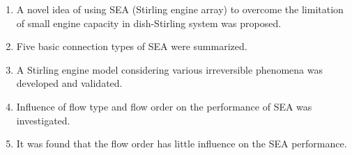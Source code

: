\documentclass[12pt]{letter}
\begin{document}
\begin{enumerate}
\item A novel idea of using SEA (Stirling engine array) to overcome the limitation of small engine capacity in dish-Stirling system was proposed.

\item Five basic connection types of SEA were summarized.

\item A Stirling engine model considering various irreversible phenomena was developed and validated.

\item Influence of flow type and flow order on the performance of SEA was investigated.

\item It was found that the flow order has little influence on the SEA performance.
\end{enumerate}
\end{document}
